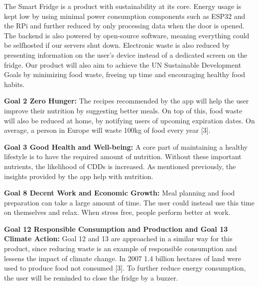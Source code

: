 The Smart Fridge is a product with sustainability at its core.
Energy usage is kept low by using minimal power consumption components such as ESP32 and
the RPi and further reduced by only processing data when the door is opened.
The backend is also powered by open-source software, meaning everything could be selfhosted if our servers shut down.
Electronic waste is also reduced by presenting information on the user's device instead of a dedicated screen on the fridge.
Our product will also aim to achieve the UN Sustainable Development Goals by minimizing food waste,
freeing up time and encouraging healthy food habits. 

{\bf Goal 2 Zero Hunger:}
The recipes recommended by the app will help the user improve their nutrition by suggesting better meals.
On top of this, food waste will also be reduced at home, by notifying users of upcoming expiration dates.
On average, a person in Europe will waste 100kg of food every year [3].  

{\bf Goal 3 Good Health and Well-being:}
A core part of maintaining a healthy lifestyle is to have the required amount of nutrition.
Without these important nutrients, the likelihood of CDDs is increased.
As mentioned previously, the insights provided by the app help with nutrition.  

{\bf Goal 8 Decent Work and Economic Growth:}
Meal planning and food preparation can take a large amount of time.
The user could instead use this time on themselves and relax.
When stress free, people perform better at work.  

{\bf Goal 12 Responsible Consumption and Production and Goal 13 Climate Action:}
Goal 12 and 13 are approached in a similar way for this product, 
since reducing waste is an example of responsible consumption and lessens the impact of climate change.
In 2007 1.4 billion hectares of land were used to produce food not consumed [3].
To further reduce energy consumption, the user will be reminded to close the fridge by a buzzer. 